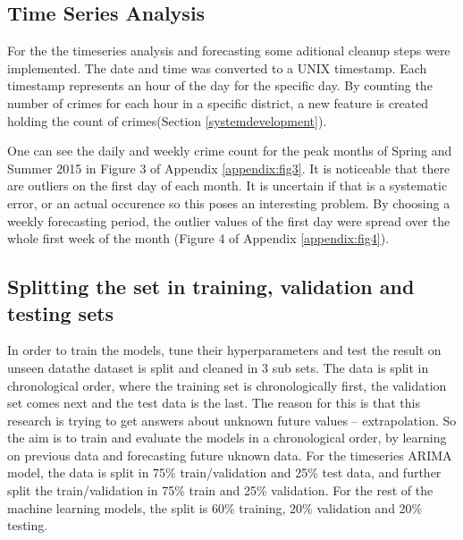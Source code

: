 \documentclass[a4paper, twocolumn]{article}
\begin{document}
\subsection{Time Series Analysis}
For the the timeseries analysis and forecasting some aditional cleanup steps were implemented. 
The date and time was converted to a UNIX timestamp. 
Each timestamp represents an hour of the day for the specific day.
By counting the number of crimes for each hour in a specific district, a new feature is created holding the count of crimes(Section \ref{systemdevelopment}).

One can see the daily and weekly crime count for the peak months of Spring and Summer 2015 
in Figure 3 of Appendix \ref{appendix:fig3}. 
It is noticeable that there are outliers on the first day of each month. 
It is uncertain if that is a systematic error, or an actual occurence so this poses an interesting problem. 
By choosing a weekly forecasting period, the outlier values of the first day were spread over the whole first week of the month (Figure 4 of Appendix \ref{appendix:fig4}).

\subsection{Splitting the set in training, validation and testing sets}\label{split}
In order to train the models, tune their hyperparameters and test the result on unseen datathe dataset is split and cleaned in 3 sub sets.
The data is split in chronological order, where the training set is chronologically first, the validation set comes next and the test data is the last. 
The reason for this is that this research is trying to get answers about unknown future values – extrapolation. 
So the aim is to train and evaluate the models in a chronological order, by learning on previous data and forecasting future uknown data. 
For the timeseries ARIMA model, the data is split in 75\% train/validation and 25\% test data, and further split the train/validation in 75\% train and 25\% validation. 
For the rest of the machine learning models, the split is 60\% training, 20\% validation and 20\% testing.
\end{document}
